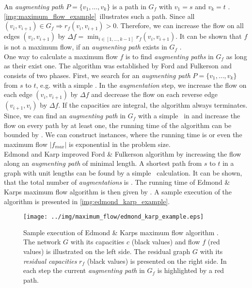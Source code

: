 An \emph{augmenting path} $P = \{v_1,\ldots,v_k\}$ is a path in $G_f$ with $v_1 = s$ and 
$v_k = t$ \cite{edmonds1972theoretical}. \autoref{img:maximum_flow_example}~illustrates such a path.
Since all $(v_i,v_{i+1}) \in G_f \Rightarrow r_f(v_i,v_{i+1}) > 0$. 
Therefore, we can increase the flow on all edges $(v_i,v_{i+1})$ by 
$\Delta f = \min_{i \in [1,\ldots,k-1]} r_f(v_i,v_{i+1})$. It can be shown that $f$ is not a
maximum flow, if an \emph{augmenting path} exists in $G_f$ \cite{edmonds1972theoretical}. \\
One way to calculate a maximum flow $f$ is to find \emph{augmenting paths} in $G_f$ as
long as their exist one. The algorithm was established by Ford and Fulkerson \cite{ford1956maximal} and
consists of two phases. First, we search for an \emph{augmenting path} $P = \{v_1,\ldots,v_k\}$
from $s$ to $t$, e.g. with a simple \DFS. In the \emph{augmentation} step, we increase the flow on each
edge $(v_i,v_{i+1})$ by $\Delta f$ and decrease the flow on each reverse edge $(v_{i+1},v_i)$
by $\Delta f$. If the capacities are integral, the algorithm always terminates. Since, we can find an \emph{augmenting
path} in $G_f$ with a simple \DFS~in  and increase the
flow on every path by at least one, the running time of the algorithm can be bounded by .
We can construct instances, where the running time is  or even the maximum flow $|f_{max}|$ 
is exponential in the problem size. \\
Edmond and Karp \cite{edmonds1972theoretical} improved Ford \& Fulkerson algorithm by increasing the flow
along an \emph{augmenting path} of minimal length. A shortest path from $s$ to $t$ in a 
graph with unit lengths can be found by a simple \BFS~calculation. It can be shown, that the
total number of \emph{augmentations} is . The running time of Edmond \& Karps
maximum flow algorithm is then given by . A sample execution of the algorithm
is presented in \autoref{img:edmond_karp_example}.

\begin{figure}
\centering
\texttt{[image: ../img/maximum\_flow/edmond\_karp\_example.eps]}
\caption{Sample execution of Edmond \& Karps maximum flow algorithm \cite{edmonds1972theoretical}.
         The network $G$ with its capacities $c$ (black values) and flow $f$ (red values) is illustrated
         on the left side. The residual graph $G$ with its \emph{residual capacities} $r_f$ (black values)
         is presented on the right side. In each step the current \emph{augmenting path} in $G_f$ is highlighted
         by a red path. }
\label{img:edmond_karp_example}
\end{figure}


